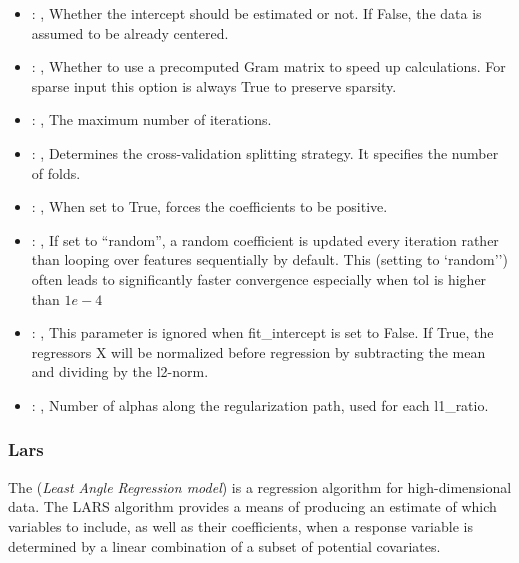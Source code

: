 \begin{itemize}
    \item {}: , 
      Whether the intercept should be estimated or not. If False,
      the data is assumed to be already centered.

    \item {}: , 
      Whether to use a precomputed Gram matrix to speed up calculations.
      For sparse input this option is always True to preserve sparsity.

    \item {}: , 
      The maximum number of iterations.

    \item {}: , 
      Determines the cross-validation splitting strategy.
      It specifies the number of folds.

    \item {}: , 
      When set to True, forces the coefficients to be positive.

    \item {}: , 
      If set to ``random'', a random coefficient is updated every iteration
      rather than looping over features sequentially by default. This (setting to `random'')
      often leads to significantly faster convergence especially when tol is higher than $1e-4$

    \item {}: , 
      This parameter is ignored when fit\_intercept is set to False. If True,
      the regressors X will be normalized before regression by subtracting the mean and
      dividing by the l2-norm.

    \item {}: , 
      Number of alphas along the regularization path,
      used for each l1\_ratio.
  \end{itemize}


\subsubsection{Lars}
  The  (\textit{Least Angle Regression model})                         is a regression
  algorithm for high-dimensional data.                         The LARS algorithm provides a means
  of producing an estimate of which variables                         to include, as well as their
  coefficients, when a response variable is                         determined by a linear
  combination of a subset of potential covariates.

